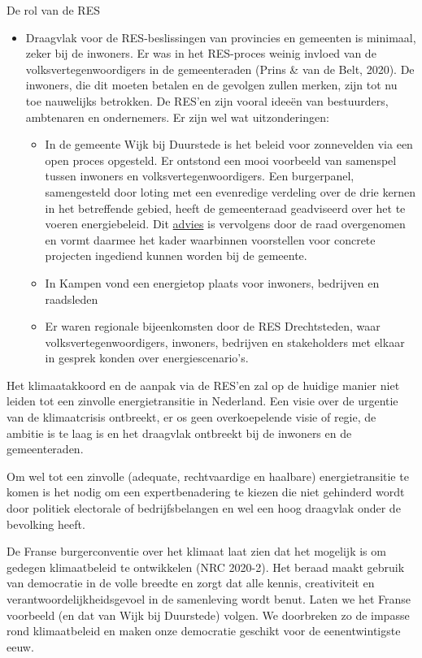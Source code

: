 \begin{voorstel}{De rol van de RES}
\begin{uitdaging}
\begin{itemize}
	\item Draagvlak voor de RES-beslissingen van provincies en gemeenten is minimaal, zeker bij de inwoners. Er was in het RES-proces weinig invloed van de volksvertegenwoordigers in de gemeenteraden (Prins \& van de Belt, 2020). De inwoners, die dit moeten betalen en de gevolgen zullen merken, zijn tot nu toe nauwelijks betrokken. De RES’en zijn vooral ideeën van bestuurders, ambtenaren en ondernemers. Er zijn wel wat uitzonderingen:
	\begin{itemize}
		\item In de gemeente Wijk bij Duurstede is het beleid voor zonnevelden via een open proces opgesteld. Er ontstond een mooi voorbeeld van samenspel tussen inwoners en volksvertegenwoordigers. Een burgerpanel, samengesteld door loting met een evenredige verdeling over de drie kernen in het betreffende gebied, heeft de gemeenteraad geadviseerd over het te voeren energiebeleid. Dit \href{https://zonneveldenwijkbijduurstede.nl/wp-content/uploads/2019/11/20190613-Advies-Burgerpanel-zonnevelden.pdf}{advies} is vervolgens door de raad overgenomen en vormt daarmee het kader waarbinnen voorstellen voor concrete projecten ingediend kunnen worden bij de gemeente.
		\item In Kampen vond een energietop plaats voor inwoners, bedrijven en raadsleden
		\item Er waren regionale bijeenkomsten door de RES Drechtsteden, waar volksvertegenwoordigers, inwoners, bedrijven en stakeholders met elkaar in gesprek konden over energiescenario’s.
	\end{itemize}
\end{itemize}

\end{uitdaging}

\begin{overwegingen}
Het klimaatakkoord en de aanpak via de RES’en zal op de huidige manier niet leiden tot een zinvolle energietransitie in Nederland. Een visie over de urgentie van de klimaatcrisis ontbreekt, er os geen overkoepelende visie of regie, de ambitie is te laag is en het draagvlak ontbreekt bij de inwoners en de gemeenteraden.

Om wel tot een zinvolle (adequate, rechtvaardige en haalbare) energietransitie te komen is het nodig om een expertbenadering te kiezen die niet gehinderd wordt door politiek electorale of bedrijfsbelangen en wel een hoog draagvlak onder de bevolking heeft.

De Franse burgerconventie over het klimaat laat zien dat het mogelijk is om gedegen klimaatbeleid te ontwikkelen (NRC 2020-2). Het beraad maakt gebruik van democratie in de volle breedte en zorgt dat alle kennis, creativiteit en verantwoordelijkheidsgevoel in de samenleving wordt benut. Laten we het Franse voorbeeld (en dat van Wijk bij Duurstede) volgen. We doorbreken zo de impasse rond klimaatbeleid en maken onze democratie geschikt voor de eenentwintigste eeuw.
\end{overwegingen}


\end{voorstel}
